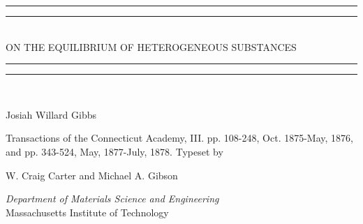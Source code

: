 \documentclass[11pt]{report}
\newlength{\drop}
\begin{document}
  \begin{titlepage}
    \textheight
    \centering
    \vspace*{\baselineskip}
    \rule{\textwidth}{1.6pt}\vspace*{-\baselineskip}\vspace*{2pt}
    \rule{\textwidth}{0.4pt}\\[\baselineskip]
    {\LARGE ON THE EQUILIBRIUM OF HETEROGENEOUS
SUBSTANCES}\\[0.2\baselineskip]
    \rule{\textwidth}{0.4pt}\vspace*{-\baselineskip}\vspace{3.2pt}
    \rule{\textwidth}{1.6pt}\\[\baselineskip]
    \scshape

    \vspace*{2\baselineskip}
    {\Large Josiah Willard Gibbs\par} \vspace{2 em}
Transactions of the Connecticut Academy, III. pp. 108-248, Oct. 1875-May,
1876, and pp. 343-524, May, 1877-July, 1878.
    \vfill
    Typeset by\\
    {\Large W. Craig Carter and Michael A. Gibson \par} \vspace{2 em}
    {\itshape  Department of Materials Science and Engineering \vspace*{0 em}}\\
    {\large Massachusetts Institute of Technology}\par
  \end{titlepage}
\end{document}
